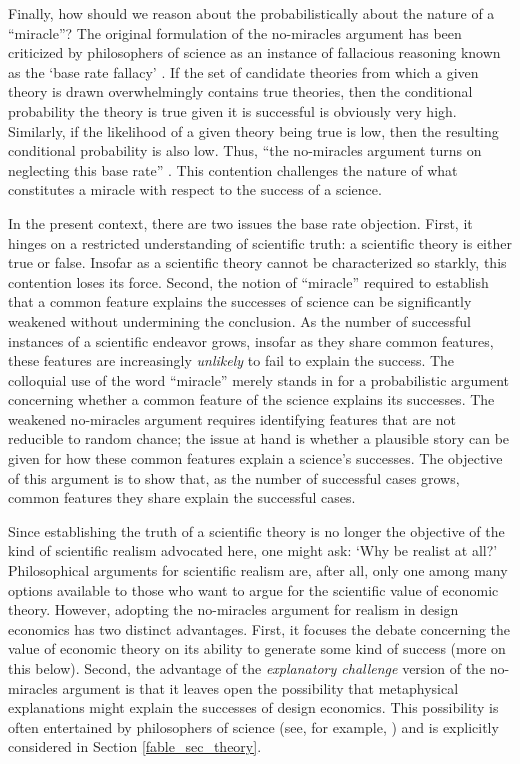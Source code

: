 Finally, how should we reason about the probabilistically about the nature of a ``miracle''? The original formulation of the no-miracles argument has been criticized by philosophers of science as an instance of fallacious reasoning known as the `base rate fallacy' \autocite{callender2004}. If the set of candidate theories from which a given theory is drawn overwhelmingly contains true theories, then the conditional probability the theory is true given it is successful is obviously very high. Similarly, if the likelihood of a given theory being true is low, then the resulting conditional probability is also low. Thus, ``the no-miracles argument turns on neglecting this base rate'' \autocite[326]{callender2004}. This contention challenges the nature of what constitutes a miracle with respect to the success of a science.

In the present context, there are two issues the base rate objection. First, it hinges on a restricted understanding of scientific truth: a scientific theory is either true or false. Insofar as a scientific theory cannot be characterized so starkly, this contention loses its force. Second, the notion of ``miracle'' required to establish that a common feature explains the successes of science can be significantly weakened without undermining the conclusion. As the number of successful instances of a scientific endeavor grows, insofar as they share common features, these features are increasingly \textit{unlikely} to fail to explain the success. The colloquial use of the word ``miracle'' merely stands in for a probabilistic argument concerning whether a common feature of the science explains its successes. The weakened no-miracles argument requires identifying features that are not reducible to random chance; the issue at hand is whether a plausible story can be given for how these common features explain a science's successes. The objective of this argument is to show that, as the number of successful cases grows, common features they share explain the successful cases.

Since establishing the truth of a scientific theory is no longer the objective of the kind of scientific realism advocated here, one might ask: `Why be realist at all?' Philosophical arguments for scientific realism are, after all, only one among many options available to those who want to argue for the scientific value of economic theory. However, adopting the no-miracles argument for realism in design economics has two distinct advantages. First, it focuses the debate concerning the value of economic theory on its ability to generate some kind of success (more on this below). Second, the advantage of the \textit{explanatory challenge} version of the no-miracles argument is that it leaves open the possibility that metaphysical explanations might explain the successes of design economics. This possibility is often entertained by philosophers of science (see, for example, \cite{ross2008}) and is explicitly considered in Section \ref{fable_sec_theory}. 


